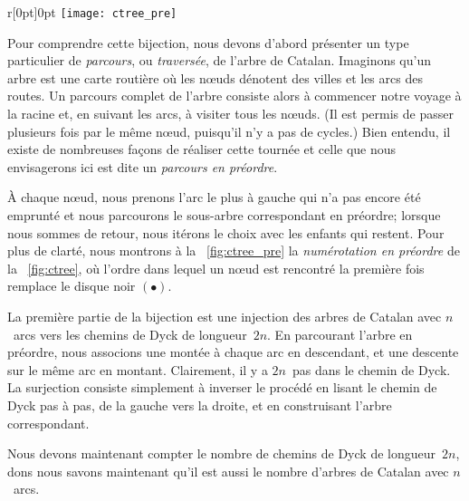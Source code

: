 \begin{wrapfigure}[7]{r}[0pt]{0pt}
\centering
\texttt{[image: ctree\_pre]}
\caption{\label{fig:ctree_pre}}
\end{wrapfigure}
Pour comprendre cette bijection, nous devons d'abord présenter un type
particulier de \emph{parcours}, ou
\emph{traversée}, de l'arbre de
Catalan. Imaginons qu'un arbre est une carte routière où les n{\oe}uds
dénotent des villes et les arcs des routes. Un parcours complet de
l'arbre consiste alors à commencer notre voyage à la racine et, en
suivant les arcs, à visiter tous les n{\oe}uds. (Il est permis de
passer plusieurs fois par le même n{\oe}ud, puisqu'il n'y a pas de
cycles.) Bien entendu, il existe de nombreuses façons de réaliser
cette tournée et celle que nous envisagerons ici est dite un
\emph{parcours en préordre}.

À chaque n{\oe}ud, nous prenons l'arc le plus à gauche qui n'a pas
encore été emprunté et nous parcourons le sous-arbre correspondant en
préordre; lorsque nous sommes de retour, nous itérons le choix avec
les enfants qui restent. Pour plus de clarté, nous montrons à la
\fig~\ref{fig:ctree_pre} la \emph{numérotation en
  préordre} de
la \fig~\ref{fig:ctree}, où l'ordre dans lequel un n{\oe}ud est
rencontré la première fois remplace le disque noir \((\bullet)\).

La première partie de la bijection est une injection des arbres de
Catalan avec \(n\)~arcs vers les chemins de Dyck de
longueur~\(2n\). En parcourant l'arbre en préordre, nous associons une
montée à chaque arc en descendant, et une descente sur le même arc en
montant. Clairement, il y a \(2n\)~pas dans le chemin de Dyck. La
surjection consiste simplement à inverser le procédé en lisant le
chemin de Dyck pas à pas, de la gauche vers la droite, et en
construisant l'arbre correspondant.

Nous devons maintenant compter le nombre de chemins de Dyck de
longueur~\(2n\), dons nous savons maintenant qu'il est aussi le nombre
d'arbres de Catalan avec \(n\)~arcs.

